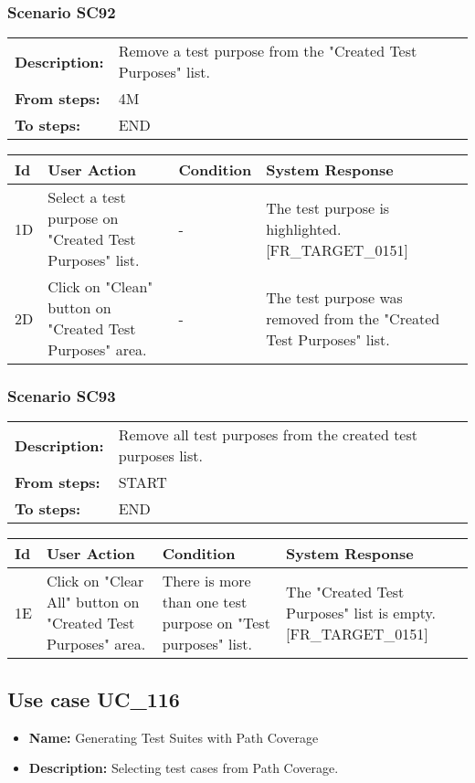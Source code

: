 \documentclass[a4paper,11pt]{article}
\newcommand{\bl}{\\ \hline}
\begin{document}
\subsubsection*{Scenario SC92}
\begin{tabular}{p{1in}p{4in}}
{\bf Description:} & Remove a test purpose from the "Created Test Purposes"
					list. \\
{\bf From steps:} & 4M \\
{\bf To steps:} & END \\
\end{tabular}
 
\begin{tabular}{|p{0.8in}|p{1.6in}|p{1.6in}|p{1.6in}|}
\hline
Id & User Action & Condition & System Response  \bl 
1D & Select a test purpose on "Created Test Purposes" list.
					 & - & The test purpose is highlighted. [FR_TARGET_0151]
					 \bl 
2D & Click on "Clean" button on "Created Test Purposes" area.
					 & - & The test purpose was removed from the "Created Test
						Purposes" list. \bl 
\end{tabular}
\subsubsection*{Scenario SC93}
\begin{tabular}{p{1in}p{4in}}
{\bf Description:} & Remove all test purposes from the created test purposes
					list. \\
{\bf From steps:} & START \\
{\bf To steps:} & END \\
\end{tabular}
 
\begin{tabular}{|p{0.8in}|p{1.6in}|p{1.6in}|p{1.6in}|}
\hline
Id & User Action & Condition & System Response  \bl 
1E & Click on "Clear All" button on "Created Test Purposes"
						area.  & There is more than one test purpose on "Test purposes"
						list. & The "Created Test Purposes" list is empty.
						[FR_TARGET_0151] \bl 
\end{tabular}
\subsection*{Use case UC_116}
\begin{itemize}
\item {\bf Name: }Generating Test Suites with Path Coverage
\item {\bf Description: }Selecting test cases from Path Coverage.
\end{itemize}
\end{document}
